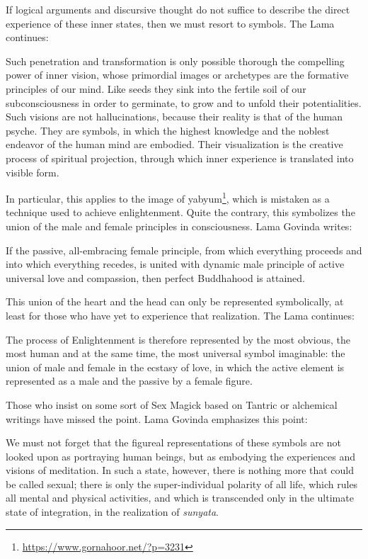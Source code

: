 If logical arguments and discursive thought do not suffice to describe the direct experience of these inner states, then we must resort to symbols. The Lama continues:

\begin{quotex}
Such penetration and transformation is only possible thorough the compelling power of inner vision, whose primordial images or archetypes are the formative principles of our mind. Like seeds they sink into the fertile soil of our subconsciousness in order to germinate, to grow and to unfold their potentialities.  Such visions are not hallucinations, because their reality is that of the human psyche. They are symbols, in which the highest knowledge and the noblest endeavor of the human mind are embodied. Their visualization is the creative process of spiritual projection, through which inner experience is translated into visible form.
\end{quotex}


In particular, this applies to the image of yabyum\footnote{\url{https://www.gornahoor.net/?p=3231}}, which is mistaken as a technique used to achieve enlightenment. Quite the contrary, this symbolizes the union of the male and female principles in consciousness. Lama Govinda writes:

\begin{quotex}
If the passive, all-embracing female principle, from which everything proceeds and into which everything recedes, is united with dynamic male principle of active universal love and compassion, then perfect Buddhahood is attained.
\end{quotex}


This union of the heart and the head can only be represented symbolically, at least for those who have yet to experience that realization. The Lama continues:

\begin{quotex}
The process of Enlightenment is therefore represented by the most obvious, the most human and at the same time, the most universal symbol imaginable: the union of male and female in the ecstasy of love, in which the active element is represented as a male and the passive by a female figure.
\end{quotex}


Those who insist on some sort of Sex Magick based on Tantric or alchemical writings have missed the point. Lama Govinda emphasizes this point:

\begin{quotex}
We must not forget that the figureal representations of these symbols are not looked upon as portraying human beings, but as embodying the experiences and visions of meditation. In such a state, however, there is nothing more that could be called sexual; there is only the super-individual polarity of all life, which rules all mental and physical activities, and which is transcended only in the ultimate state of integration, in the realization of \emph{sunyata}.
\end{quotex}



